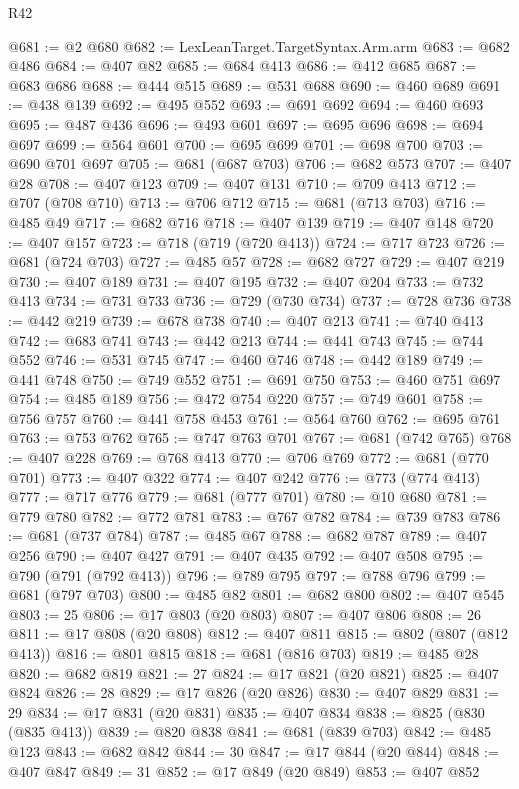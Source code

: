 \begin{lexlean}{R42}
\begin{coremodule}
@681 := @2 @680
@682 := LexLeanTarget.TargetSyntax.Arm.arm
@683 := @682 @486
@684 := @407 @82
@685 := @684 @413
@686 := @412 @685
@687 := @683 @686
@688 := @444 @515
@689 := @531 @688
@690 := @460 @689
@691 := @438 @139
@692 := @495 @552
@693 := @691 @692
@694 := @460 @693
@695 := @487 @436
@696 := @493 @601
@697 := @695 @696
@698 := @694 @697
@699 := @564 @601
@700 := @695 @699
@701 := @698 @700
@703 := @690 @701 @697
@705 := @681 (@687 @703)
@706 := @682 @573
@707 := @407 @28
@708 := @407 @123
@709 := @407 @131
@710 := @709 @413
@712 := @707 (@708 @710)
@713 := @706 @712
@715 := @681 (@713 @703)
@716 := @485 @49
@717 := @682 @716
@718 := @407 @139
@719 := @407 @148
@720 := @407 @157
@723 := @718 (@719 (@720 @413))
@724 := @717 @723
@726 := @681 (@724 @703)
@727 := @485 @57
@728 := @682 @727
@729 := @407 @219
@730 := @407 @189
@731 := @407 @195
@732 := @407 @204
@733 := @732 @413
@734 := @731 @733
@736 := @729 (@730 @734)
@737 := @728 @736
@738 := @442 @219
@739 := @678 @738
@740 := @407 @213
@741 := @740 @413
@742 := @683 @741
@743 := @442 @213
@744 := @441 @743
@745 := @744 @552
@746 := @531 @745
@747 := @460 @746
@748 := @442 @189
@749 := @441 @748
@750 := @749 @552
@751 := @691 @750
@753 := @460 @751 @697
@754 := @485 @189
@756 := @472 @754 @220
@757 := @749 @601
@758 := @756 @757
@760 := @441 @758 @453
@761 := @564 @760
@762 := @695 @761
@763 := @753 @762
@765 := @747 @763 @701
@767 := @681 (@742 @765)
@768 := @407 @228
@769 := @768 @413
@770 := @706 @769
@772 := @681 (@770 @701)
@773 := @407 @322
@774 := @407 @242
@776 := @773 (@774 @413)
@777 := @717 @776
@779 := @681 (@777 @701)
@780 := @10 @680
@781 := @779 @780
@782 := @772 @781
@783 := @767 @782
@784 := @739 @783
@786 := @681 (@737 @784)
@787 := @485 @67
@788 := @682 @787
@789 := @407 @256
@790 := @407 @427
@791 := @407 @435
@792 := @407 @508
@795 := @790 (@791 (@792 @413))
@796 := @789 @795
@797 := @788 @796
@799 := @681 (@797 @703)
@800 := @485 @82
@801 := @682 @800
@802 := @407 @545
@803 := 25
@806 := @17 @803 (@20 @803)
@807 := @407 @806
@808 := 26
@811 := @17 @808 (@20 @808)
@812 := @407 @811
@815 := @802 (@807 (@812 @413))
@816 := @801 @815
@818 := @681 (@816 @703)
@819 := @485 @28
@820 := @682 @819
@821 := 27
@824 := @17 @821 (@20 @821)
@825 := @407 @824
@826 := 28
@829 := @17 @826 (@20 @826)
@830 := @407 @829
@831 := 29
@834 := @17 @831 (@20 @831)
@835 := @407 @834
@838 := @825 (@830 (@835 @413))
@839 := @820 @838
@841 := @681 (@839 @703)
@842 := @485 @123
@843 := @682 @842
@844 := 30
@847 := @17 @844 (@20 @844)
@848 := @407 @847
@849 := 31
@852 := @17 @849 (@20 @849)
@853 := @407 @852

\end{coremodule}
\end{lexlean}

